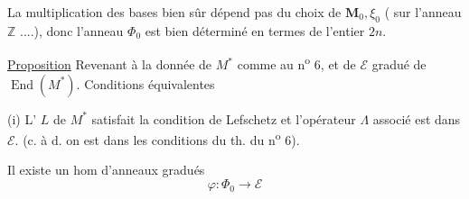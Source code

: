 La multiplication des bases  bien sûr dépend pas du choix de $\mathbf M_0,\xi_0$ (  sur l'anneau $\mathbb Z$ ....), donc l'anneau $\Phi_0$ est bien déterminé en termes de l'entier  $2n$.

\uline{Proposition} Revenant à la donnée de $M^*$ comme au n\textsuperscript{o} 6, et de $\mathcal E$  gradué de  $\operatorname{End}(M^*)$.
Conditions équivalentes

(i) L' $L$ de $M^*$ satisfait la condition de  Lefschetz et l'opérateur $\Lambda$ associé est dans $\mathcal E$.
(c. à d. on est dans les conditions du th. du n\textsuperscript{o} 6).

 Il existe un hom d'anneaux gradués
\[
\varphi:\Phi_0\longrightarrow\mathcal E
\]
